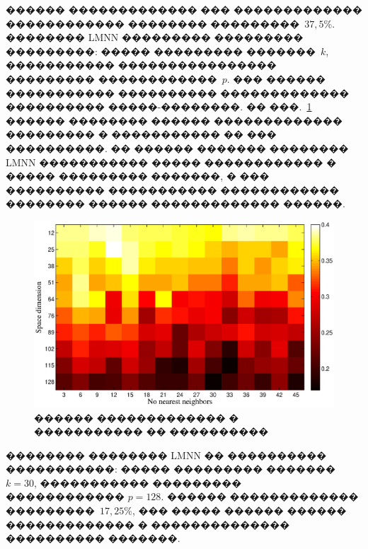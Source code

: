 \documentclass[12pt,twoside, notitlepage]{article}
\begin{document}
������ ������������� ��� ������������� ������������ �������� ���������~$37,5\%$.
�������� LMNN ��������� ��������� ���������: ����� ��������� �������~$k$,
����������� ���������������� ��������� ������������~$p$.
��� ������ ����������� ���������� ������������� ���������� �����-��������.
�� ���.~\ref{heat_map} ������ �������� ������ ������������� ��������� � ����������� �� ��� ����������.
�� ������ ������� �������� LMNN ����������� ����� ������������ � ����� ��������� �������,
� ��� ���������� ����������� ������������ �������� ������ ������������� ������.
\begin{figure}[h]
\centering
    \includegraphics[width=1\linewidth]{fig/heat_map}
    \caption{������ ������������� � ����������� �� ����������}
\label{heat_map}
\end{figure}

�������� �������� LMNN �� ���������� �����������: ����� ��������� ������� $k = 30$, �����������
��������� ������������ $p = 128$.
������ ������������� ���������~$17,25\%$, ��� ����� ������ ������ ������������� � �������������� ���������� �������.
\end{document}
